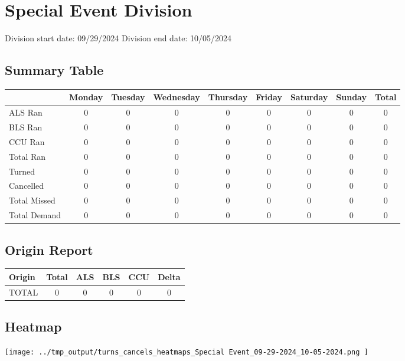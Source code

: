 \documentclass{article}
\begin{document}
\section{ Special Event Division}

Division start date: 09/29/2024
Division end date: 10/05/2024

\subsection{Summary Table}
\begin{longtable}{l|cccccccc}
\toprule
 & Monday & Tuesday & Wednesday & Thursday & Friday & Saturday & Sunday & Total \\
\midrule

ALS Ran & 
0 & 
0 & 
0 & 
0 & 
0 & 
0 & 
0 & 
0 \\

BLS Ran & 
0 & 
0 & 
0 & 
0 & 
0 & 
0 & 
0 & 
0 \\

CCU Ran & 
0 & 
0 & 
0 & 
0 & 
0 & 
0 & 
0 & 
0 \\

Total Ran & 
0 & 
0 & 
0 & 
0 & 
0 & 
0 & 
0 & 
0 \\

Turned & 
0 & 
0 & 
0 & 
0 & 
0 & 
0 & 
0 & 
0 \\

Cancelled & 
0 & 
0 & 
0 & 
0 & 
0 & 
0 & 
0 & 
0 \\

Total Missed & 
0 & 
0 & 
0 & 
0 & 
0 & 
0 & 
0 & 
0 \\

Total Demand & 
0 & 
0 & 
0 & 
0 & 
0 & 
0 & 
0 & 
0 \\

\bottomrule
\end{longtable}

\subsection{Origin Report}
\begin{longtable}{l|ccccc}
\toprule
Origin & Total & ALS & BLS & CCU & Delta \\
\midrule

TOTAL & 0 & 0 & 0 & 0 & 0 \\

\bottomrule
\end{longtable}

\subsection{Heatmap}
\texttt{[image:  ../tmp\_output/turns\_cancels\_heatmaps\_Special Event\_09-29-2024\_10-05-2024.png ]}
\end{document}
